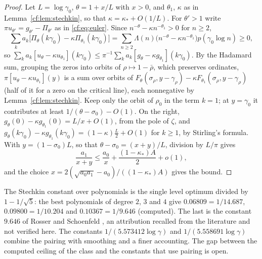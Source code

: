 \begin{proof}
Let $L=\log\gamma_0$, $\theta=1+x/L$ with $x>0$, and $\theta_1$, $\kappa$ as in Lemma~\ref{cf:lem:stechkin}, so that $\kappa=\kappa_\ast+O(1/L)$. For $\theta'>1$ write $\pi u_{\theta'}=g_{\theta'}-\Pi_{\theta'}$ as in \eqref{cf:eq:euler}. Since $n^{-\theta}-\kappa n^{-\theta_1}>0$ for $n\ge2$,
\[
\sum_ka_k\bigl[\Pi_\theta(k\gamma_0)-\kappa\Pi_{\theta_1}(k\gamma_0)\bigr]=\sum_{n\ge2}\Lambda(n)\bigl(n^{-\theta}-\kappa n^{-\theta_1}\bigr)p(\gamma_0\log n)\ge0,
\]
so $\sum_ka_k[u_\theta-\kappa u_{\theta_1}](k\gamma_0)\le\pi^{-1}\sum_ka_k[g_\theta-\kappa g_{\theta_1}](k\gamma_0)$. By the Hadamard sum, grouping the zeros into orbits of $\rho\mapsto1-\bar\rho$, which preserves ordinates, $\pi[u_\theta-\kappa u_{\theta_1}](y)$ is a sum over orbits of $F_\theta(\sigma_\rho,y-\gamma_\rho)-\kappa F_{\theta_1}(\sigma_\rho,y-\gamma_\rho)$ (half of it for a zero on the critical line), each nonnegative by Lemma~\ref{cf:lem:stechkin}. Keep only the orbit of $\rho_0$ in the term $k=1$; at $y=\gamma_0$ it contributes at least $1/(\theta-\sigma_0)-O(1)$. On the right, $g_\theta(0)-\kappa g_{\theta_1}(0)=L/x+O(1)$, from the pole of $\zeta$, and $g_\theta(k\gamma_0)-\kappa g_{\theta_1}(k\gamma_0)=(1-\kappa)\frac L2+O(1)$ for $k\ge1$, by Stirling's formula. With $y=(1-\sigma_0)L$, so that $\theta-\sigma_0=(x+y)/L$, division by $L/\pi$ gives
\[
\frac{a_1}{x+y}\le\frac{a_0}x+\frac{(1-\kappa_\ast)A}2+o(1),
\]
and the choice $x=2(\sqrt{a_0a_1}-a_0)/((1-\kappa_\ast)A)$ gives the bound.
\end{proof}

The Stechkin constant over polynomials is the single level optimum divided by $1-1/\sqrt5$: the best polynomials of degree $2$, $3$ and $4$ give $0.06809=1/14.687$, $0.09800=1/10.204$ and $0.10367=1/9.646$ (computed). The last is the constant $9.646$ of Rosser and Schoenfeld \cite{RS75}, an attribution recalled from the literature and not verified here. The constants $1/(5.573412\log\gamma)$ \cite{MT15} and $1/(5.558691\log\gamma)$ \cite{MTY} combine the pairing with smoothing and a finer accounting. The gap between the computed ceiling of the class and the constants that use pairing is open.
